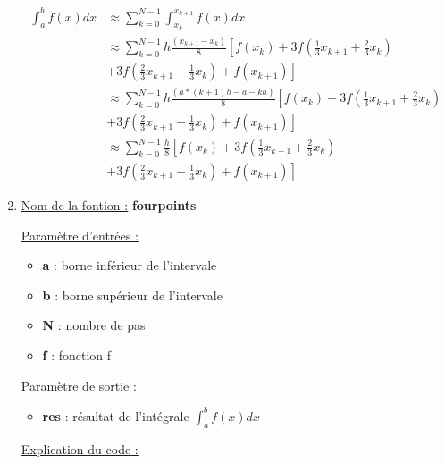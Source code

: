 \documentclass[12pt, letterpaper]{article}
\begin{document}
\begin{enumerate}
  \begin{equation*}
    \begin{split}
      \int_a^b {f(x) dx} & \approx \sum_{k = 0}^{N - 1}{\int_{x_k}^{x_{k + 1}}{f(x) dx}} \\
      & \approx \sum_{k = 0}^{N - 1} h \frac{(x_{k + 1} - x_k)}{8} \left[ f(x_k) + 3
          f\left( \frac{1}{3} x_{k + 1} + \frac{2}{3} x_k \right)
          \right. \\
      & \left . + 3 f\left( \frac{2}{3} x_{k + 1} + \frac{1}{3} x_k
          \right) + f(x_{k + 1}) \right] \\
      & \approx \sum_{k = 0}^{N - 1} h \frac{(a * (k + 1)h - a - kh)}{8} \left[ f(x_k) + 3
          f\left( \frac{1}{3} x_{k + 1} + \frac{2}{3} x_k \right)
          \right. \\
      & \left . + 3 f\left( \frac{2}{3} x_{k + 1} + \frac{1}{3} x_k
          \right) + f(x_{k + 1}) \right] \\
      & \approx \sum_{k = 0}^{N - 1} \frac{h}{8} \left[ f(x_k) + 3
          f\left( \frac{1}{3} x_{k + 1} + \frac{2}{3} x_k \right)
          \right. \\
      & \left . + 3 f\left( \frac{2}{3} x_{k + 1} + \frac{1}{3} x_k
          \right) + f(x_{k + 1}) \right]
      \end{split}
  \end{equation*}

\item
  \underline{Nom de la fontion :} \textbf{fourpoints} \newline
  
  \underline{Paramètre d'entrées :}
  \begin{itemize}
  \item \textbf{a} : borne inférieur de l'intervale
  \item \textbf{b} : borne supérieur de l'intervale
  \item \textbf{N} : nombre de pas
  \item \textbf{f} : fonction f
  \end{itemize}

  \underline{Paramètre de sortie :}
  \begin{itemize}
  \item \textbf{res} : résultat de l'intégrale $\int_a^b {f(x) dx}$
  \end{itemize}

  \underline{Explication du code :} \newline
  

\end{enumerate}
\end{document}
